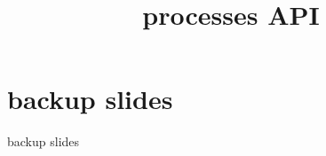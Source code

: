 \graphicspath{{./figures/}}
\title{processes API}
\date{}

\begin{frame}
    \titlepage
\end{frame}





\section{backup slides}
\begin{frame}{backup slides}
\end{frame}

%


